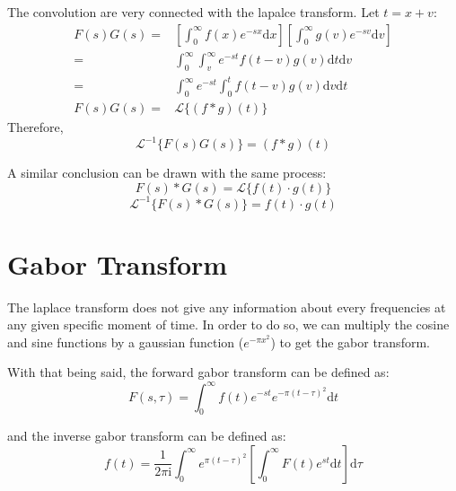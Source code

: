 \documentclass[12pt]{article}
\begin{document}
The convolution are very connected with the lapalce transform. Let $t=x+v$: 
\begin{align*}
    F(s)G(s) 
    =& \left[\int_{0}^{\infty} f(x)e^{-sx} \mathrm{d}x\right]\left[\int_{0}^{\infty} g(v)e^{-sv} \mathrm{d}v\right] \\
    =& \int_{0}^{\infty} \int_{v}^{\infty}e^{-st} f(t-v)g(v) \mathrm{d}t \mathrm{d}v \\
    =& \int_{0}^{\infty} e^{-st} \int_{0}^{t} f(t-v)g(v) \mathrm{d}v \mathrm{d}t \\
    F(s)G(s) 
    =& \mathcal{L}\{ (f*g)(t) \}
\end{align*}
Therefore, 
    $$\mathcal{L}^{-1}\{ F(s)G(s) \} = (f*g)(t) $$

A similar conclusion can be drawn with the same process: 
    $$F(s)*G(s) = \mathcal{L}\{ f(t) \cdot g(t) \}$$
    $$\mathcal{L}^{-1}\{ F(s)*G(s) \} = f(t) \cdot g(t)$$







\section{Gabor Transform}
The laplace transform does not give any information about every frequencies at any given specific moment of time. 
In order to do so, we can multiply the cosine and sine functions by a gaussian function ($e^{-\pi x^2}$) to get 
the gabor transform. 

With that being said, the forward gabor transform can be defined as:
\begin{equation}
    F(s,\tau) = \int_{0}^{\infty} f(t) e^{-st}e^{-\pi(t-\tau)^2} \mathrm{d}t
\end{equation}

and the inverse gabor transform can be defined as:
\begin{equation}
    f(t) = \frac{1}{2\pi\mathrm{i}} \int_{0}^{\infty} e^{\pi(t-\tau)^2} \left[ \int_{0}^{\infty} F(t) e^{st} \mathrm{d}t  \right] \mathrm{d}\tau
\end{equation}
\end{document}
